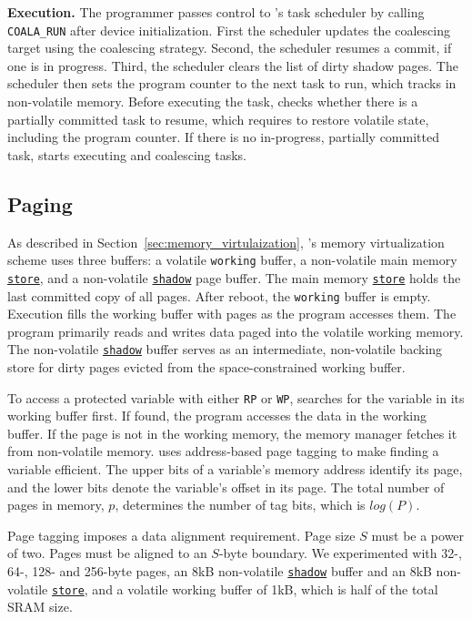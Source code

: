 \textbf{Execution.} The programmer passes control to \sys's task scheduler 
by calling \texttt{COALA\_RUN} after device initialization. 
%
First the scheduler updates the coalescing target using the coalescing
strategy.  Second, the scheduler resumes a commit, if one is in progress. Third,
the scheduler clears the list of dirty shadow pages. The scheduler then 
sets the program counter to the next task to run, which \sys tracks in  
non-volatile memory.  
%
Before executing the task, \sys checks whether there is a partially committed
task to resume, which requires \sys to restore volatile state, including the program
counter.  
%
If there is no in-progress, partially committed task, \sys starts executing and
coalescing tasks. 

\subsection{Paging}
\label{sec:impl:paging}

As described in Section~\ref{sec:memory_virtulaization}, \sys's memory
virtualization scheme uses three buffers: a volatile \texttt{working} buffer, a
non-volatile main memory \texttt{\underline{store}}, and a non-volatile
\texttt{\underline{shadow}} page buffer. 
%
The main memory \texttt{\underline{store}} holds the last committed copy of all 
pages. 
%
After reboot, the \texttt{working} buffer is empty. Execution fills 
the working buffer with pages as the program accesses them. 
%
The program primarily reads and writes data paged into the volatile working memory. 
%
The non-volatile \texttt{\underline{shadow}} buffer serves as an intermediate,
non-volatile backing store for dirty pages evicted from the space-constrained
working buffer. 

To access a protected variable with either \texttt{RP}
or \texttt{WP}, \sys searches for the variable in its working buffer first. If
found, the program accesses the data in the working buffer.  If the page is not 
in the working memory, the memory manager fetches it from non-volatile memory. 
%
\sys uses address-based page tagging to make finding a variable efficient.  The
upper bits of a variable's memory address identify its page, and the lower bits
denote the variable's offset in its page. The total number of pages in memory,
$p$, determines the number of tag bits, which is $log(P)$.

Page tagging imposes a data alignment requirement.
Page size $S$ must be a power of two. 
%
Pages must be aligned to an $S$-byte boundary. 
%
We experimented with 32-, 64-, 128- and 256-byte pages, an 8kB non-volatile \texttt{\underline{shadow}} buffer and
an 8kB non-volatile \texttt{\underline{store}}, and a volatile working buffer
of 1kB, which is half of the total SRAM size. 

